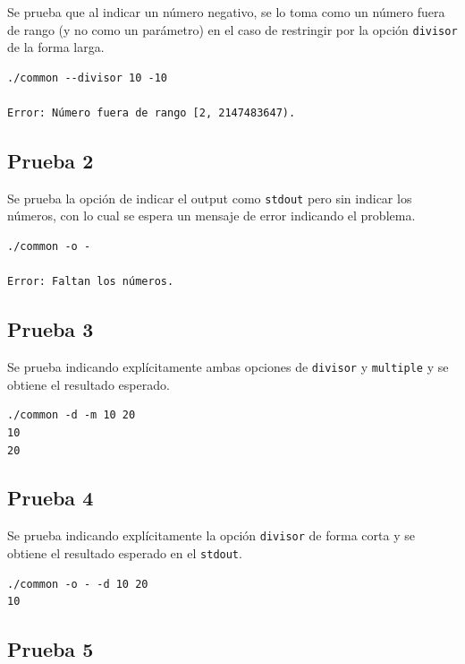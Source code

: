 \documentclass[titlepage,a4paper]{article}
\begin{document}
Se prueba que al indicar un número negativo, se lo toma como un número fuera de rango (y no como un parámetro) en el caso de restringir por la opción \verb|divisor| de la forma larga.

\begin{lstlisting}[style=test_run_style]
./common --divisor 10 -10

Error: Número fuera de rango [2, 2147483647).

\end{lstlisting}

\subsection{Prueba 2}

Se prueba la opción de indicar el output como \verb|stdout| pero sin indicar los números, con lo cual se espera un mensaje de error indicando el problema.
\begin{lstlisting}[style=test_run_style]
./common -o -

Error: Faltan los números.

\end{lstlisting}

\subsection{Prueba 3}

Se prueba indicando explícitamente ambas opciones de \verb|divisor| y \verb|multiple| y se obtiene el resultado esperado. 
\begin{lstlisting}[style=test_run_style]
./common -d -m 10 20
10
20

\end{lstlisting}

\subsection{Prueba 4}

Se prueba indicando explícitamente la opción \verb|divisor| de forma corta y se obtiene el resultado esperado en el \verb|stdout|.

\begin{lstlisting}[style=test_run_style]
./common -o - -d 10 20
10
\end{lstlisting}

\subsection{Prueba 5}
\end{document}
